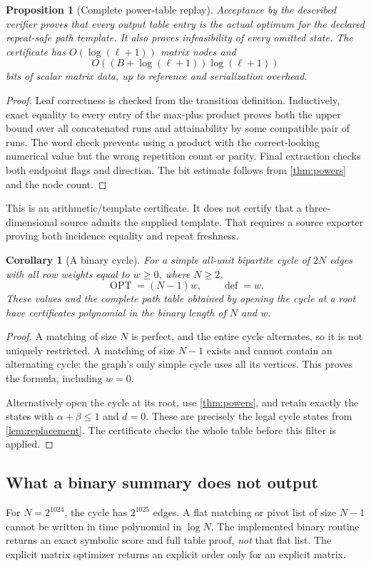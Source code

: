 \documentclass[11pt,letterpaper]{article}
\newtheorem{proposition}[proposition]{Proposition}\aliascntresetthe{proposition}
\newtheorem{corollary}[corollary]{Corollary}\aliascntresetthe{corollary}
\theoremstyle{definition}
\theoremstyle{remark}
\newcommand{\OPT}{\operatorname{OPT}}
\newcommand{\defw}{\operatorname{def}}
\begin{document}
\begin{proposition}[Complete power-table replay]
\label{prop:powercert}
Acceptance by the described verifier proves that every output table entry is the actual optimum for the declared repeat-safe path template. It also proves infeasibility of every omitted state. The certificate has $O(\log(\ell+1))$ matrix nodes and
\[
 O\!\left((B+\log(\ell+1))\log(\ell+1)\right)
\]
bits of scalar matrix data, up to reference and serialization overhead.
\end{proposition}
\begin{proof}
Leaf correctness is checked from the transition definition. Inductively, exact equality to every entry of the max-plus product proves both the upper bound over all concatenated runs and attainability by some compatible pair of runs. The word check prevents using a product with the correct-looking numerical value but the wrong repetition count or parity. Final extraction checks both endpoint flags and direction. The bit estimate follows from \cref{thm:powers} and the node count.
\end{proof}

This is an arithmetic/template certificate. It does not certify that a three-dimensional source admits the supplied template. That requires a source exporter proving both incidence equality and repeat freshness.

\begin{corollary}[A binary cycle]
\label{cor:cycle}
For a simple all-unit bipartite cycle of $2N$ edges with all row weights equal to $w\ge0$, where $N\ge2$,
\[
 \OPT=(N-1)w,\qquad \defw=w.
\]
These values and the complete path table obtained by opening the cycle at a root have certificates polynomial in the binary length of $N$ and $w$.
\end{corollary}
\begin{proof}
A matching of size $N$ is perfect, and the entire cycle alternates, so it is not uniquely restricted. A matching of size $N-1$ exists and cannot contain an alternating cycle: the graph's only simple cycle uses all its vertices. This proves the formula, including $w=0$.

Alternatively open the cycle at its root, use \cref{thm:powers}, and retain exactly the states with $\alpha+\beta\le1$ and $d=0$. These are precisely the legal cycle states from \cref{lem:replacement}. The certificate checks the whole table before this filter is applied.
\end{proof}

\subsection{What a binary summary does not output}
For $N=2^{1024}$, the cycle has $2^{1025}$ edges. A flat matching or pivot list of size $N-1$ cannot be written in time polynomial in $\log N$. The implemented binary routine returns an exact symbolic score and full table proof, \emph{not} that flat list. The explicit matrix optimizer returns an explicit order only for an explicit matrix.
\end{document}
